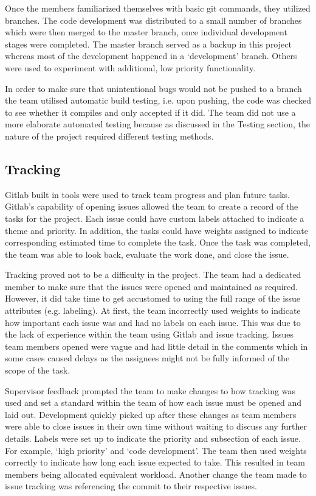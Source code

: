 \documentclass{l3proj}
\begin{document}
Once the members familiarized themselves with basic git commands, they utilized branches. The code development was distributed to a small number of branches which were then merged to the master branch, once individual development stages were completed. The master branch served as a backup in this project whereas most of the development happened in a ‘development' branch. Others were used to experiment with additional, low priority functionality.

In order to make sure that unintentional bugs would not be pushed to a branch the team utilised automatic build testing, i.e. upon pushing, the code was checked to see whether it compiles and only accepted if it did. The team did not use a more elaborate automated testing because as discussed in the Testing section, the nature of the project required different testing methods.

\subsection{Tracking}
Gitlab built in tools were used to track team progress and plan future tasks. Gitlab's capability of opening issues allowed the team to create a record of the tasks for the project. Each issue could have custom labels attached to indicate a theme and priority. In addition, the tasks could have weights assigned to indicate corresponding estimated time to complete the task. Once the task was completed, the team was able to look back, evaluate the work done, and close the issue.

Tracking proved not to be a difficulty in the project. The team had a dedicated member to make sure that the issues were opened and maintained as required. However, it did take time to get accustomed to using the full range of the issue attributes (e.g. labeling). At first, the team incorrectly used weights to indicate how important each issue was and had no labels on each issue. This was due to the lack of experience within the team using Gitlab and issue tracking. Issues team members opened were vague and had little detail in the comments which in some cases caused delays as the assignees might not be fully informed of the scope of the task.
 
Supervisor feedback prompted the team to make changes to how tracking was used and set a standard within the team of how each issue must be opened and laid out. Development quickly picked up after these changes as team members were able to close issues in their own time without waiting to discuss any further details. Labels were set up to indicate the priority and subsection of each issue. For example, ‘high priority' and ‘code development'. The team then used weights correctly to indicate how long each issue expected to take. This resulted in team members being allocated equivalent workload. Another change the team made to issue tracking was referencing the commit to their respective issues.
\end{document}
